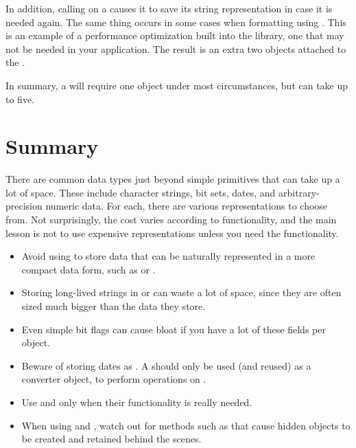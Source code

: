 In addition, calling  on a  causes it to
save its string representation in case it is needed again. The same thing occurs
in some cases when formatting using . This is an example of
a performance optimization built into the library, one that may not be needed
in your application. The result is an
extra two objects attached to the .

In summary, a  will require one
object under most circumstances, but can take up to five. 


\section{Summary} 

There are common data types just beyond simple primitives that can
take up a lot of space.  These include character strings, bit sets, dates, and
arbitrary-precision numeric data. For each, there are various
representations to choose from. Not surprisingly, the cost varies according to
functionality, and the main lesson is not to use expensive representations
unless you need the functionality.

\begin{itemize}
  \item  Avoid using  to store data that can be naturally
  represented in a more compact data form, such as  or
  .
  \item Storing long-lived strings in  or
   can waste a lot of space, since they are often sized much bigger than the data they store.
  \item Even simple bit flags can cause bloat if you have a lot of these
  fields per object.
  \item Beware of storing dates as .  A
   should only be used (and reused) as a converter
  object, to perform operations on .
  \item Use  and  only when their
  functionality is really needed.
  \item When using  and , watch out for methods
  such as  that cause hidden objects to be created and
  retained behind the scenes.
\end{itemize}









